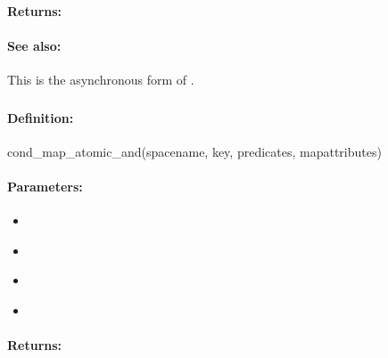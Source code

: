 \paragraph{Returns:}


\paragraph{See also:}  This is the asynchronous form of .

\pagebreak
\subsubsection{}
\label{api:ruby:cond_map_atomic_and}


\paragraph{Definition:}
\begin{rubycode}
cond_map_atomic_and(spacename, key, predicates, mapattributes)
\end{rubycode}

\paragraph{Parameters:}
\begin{itemize}[noitemsep]
\item {}\\

\item {}\\

\item {}\\

\item {}\\

\end{itemize}

\paragraph{Returns:}


